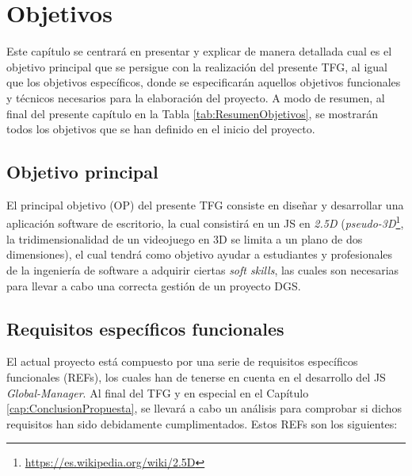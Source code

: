 \chapter{Objetivos}
\label{cap:Objetivo}

Este capítulo se centrará en presentar y explicar de manera detallada cual es el objetivo principal que se persigue con la realización del presente TFG, al igual que los objetivos específicos, donde se especificarán aquellos objetivos funcionales y técnicos necesarios para la elaboración del proyecto. A modo de resumen, al final del presente capítulo en la Tabla \ref{tab:ResumenObjetivos}, se mostrarán todos los objetivos que se han definido en el inicio del proyecto.

\section{Objetivo principal}
\label{sec:ObjetivoP}

El principal objetivo (OP) del presente TFG consiste en diseñar y desarrollar una aplicación software de escritorio, la cual consistirá en un JS en \emph{2.5D} (\emph{pseudo-3D}\footnote{\url{https://es.wikipedia.org/wiki/2.5D}}, la tridimensionalidad de un videojuego en 3D se limita a un plano de dos dimensiones), el cual tendrá como objetivo ayudar a estudiantes y profesionales de la ingeniería de software a adquirir ciertas \emph{soft skills}, las cuales son necesarias para llevar a cabo una correcta gestión de un proyecto DGS.

\section{Requisitos específicos funcionales}
\label{sec:ObjetivosF}

El actual proyecto está compuesto por una serie de requisitos específicos funcionales (REFs), los cuales han de tenerse en cuenta en el desarrollo del JS \emph{Global-Manager}. Al final del TFG y en especial en el Capítulo \ref{cap:ConclusionPropuesta}, se llevará a cabo un análisis para comprobar si dichos requisitos han sido debidamente cumplimentados. Estos REFs son los siguientes:

